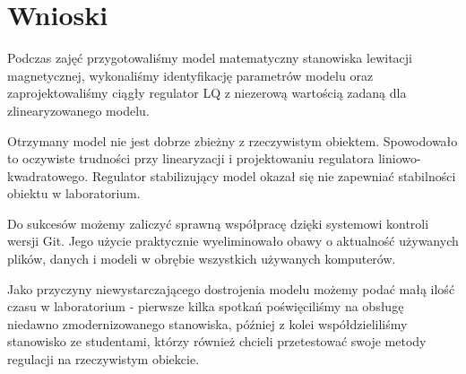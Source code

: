 \section{Wnioski}

Podczas zajęć przygotowaliśmy model matematyczny stanowiska lewitacji magnetycznej, wykonaliśmy identyfikację parametrów modelu oraz zaprojektowaliśmy ciągły regulator LQ z niezerową wartością zadaną dla zlinearyzowanego modelu.

Otrzymany model nie jest dobrze zbieżny z rzeczywistym obiektem. Spowodowało to oczywiste trudności przy linearyzacji i projektowaniu regulatora liniowo-kwadratowego. Regulator stabilizujący model okazał się nie zapewniać stabilności obiektu w laboratorium.

Do sukcesów możemy zaliczyć sprawną współpracę dzięki systemowi kontroli wersji Git. Jego użycie praktycznie wyeliminowało obawy o aktualność używanych plików, danych i modeli w obrębie wszystkich używanych komputerów.

Jako przyczyny niewystarczającego dostrojenia modelu możemy podać małą ilość czasu w laboratorium - pierwsze kilka spotkań poświęciliśmy na obsługę niedawno zmodernizowanego stanowiska, później z kolei współdzieliliśmy stanowisko ze studentami, którzy również chcieli przetestować swoje metody regulacji na rzeczywistym obiekcie.
